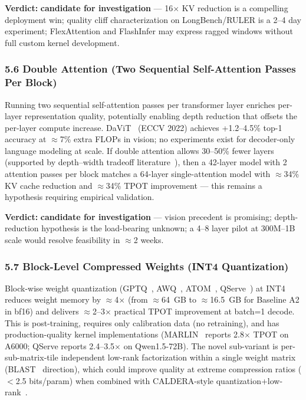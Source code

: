 \documentclass[11pt]{article}
\begin{document}
\textbf{Verdict:} \textbf{candidate for investigation} --- 16$\times$ KV reduction is a compelling deployment win; quality cliff characterization on LongBench/RULER is a 2--4 day experiment; FlexAttention and FlashInfer may express ragged windows without full custom kernel development.

\subsubsection{5.6 Double Attention (Two Sequential Self-Attention Passes Per Block)}
\label{sec:idea_5_6}

Running two sequential self-attention passes per transformer layer enriches per-layer representation quality, potentially enabling depth reduction that offsets the per-layer compute increase.
DaViT~\cite{Ding2022DaViT} (ECCV 2022) achieves +1.2--4.5\% top-1 accuracy at $\approx$7\% extra FLOPs in vision; no experiments exist for decoder-only language modeling at scale.
If double attention allows 30--50\% fewer layers (supported by depth--width tradeoff literature~\cite{Saratchandran2025DepthWidth}), then a 42-layer model with 2 attention passes per block matches a 64-layer single-attention model with $\approx$34\% KV cache reduction and $\approx$34\% TPOT improvement --- this remains a hypothesis requiring empirical validation.

\textbf{Verdict:} \textbf{candidate for investigation} --- vision precedent is promising; depth-reduction hypothesis is the load-bearing unknown; a 4--8 layer pilot at 300M--1B scale would resolve feasibility in $\approx$2 weeks.

\subsubsection{5.7 Block-Level Compressed Weights (INT4 Quantization)}
\label{sec:idea_5_7}

Block-wise weight quantization (GPTQ~\cite{Frantar2022GPTQ}, AWQ~\cite{Lin2023AWQ}, ATOM~\cite{Zhao2023ATOM}, QServe~\cite{Lin2024QServe}) at INT4 reduces weight memory by $\approx$4$\times$ (from $\approx$64~GB to $\approx$16.5~GB for Baseline A2 in bf16) and delivers $\approx$2--3$\times$ practical TPOT improvement at batch=1 decode.
This is post-training, requires only calibration data (no retraining), and has production-quality kernel implementations (MARLIN~\cite{Frantar2024MARLIN} reports 2.8$\times$ TPOT on A6000; QServe reports 2.4--3.5$\times$ on Qwen1.5-72B).
The novel sub-variant is per-sub-matrix-tile independent low-rank factorization within a single weight matrix (BLAST~\cite{Lee2024BLAST} direction), which could improve quality at extreme compression ratios ($<$2.5 bits/param) when combined with CALDERA-style quantization+low-rank~\cite{Bhatt2024CALDERA}.
\end{document}
